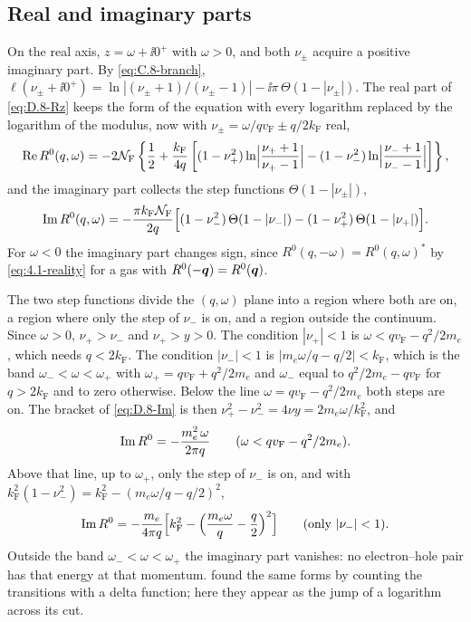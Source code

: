 \subsection*{Real and imaginary parts}

On the real axis, $z = \omega + \ii0^+$ with $\omega > 0$, and both $\nu_\pm$ acquire a positive imaginary part. By \cref{eq:C.8-branch}, $\ell(\nu_\pm + \ii0^+) = \ln|(\nu_\pm + 1)/(\nu_\pm - 1)| - \ii\pi\,\Theta(1 - |\nu_\pm|)$. The real part of \cref{eq:D.8-Rz} keeps the form of the equation with every logarithm replaced by the logarithm of the modulus, now with $\nu_\pm = \omega/qv_{\mathrm{F}} \pm q/2k_{\mathrm{F}}$ real,
\begin{equation}
  \operatorname{Re} R^0(q,\omega) = -2\mathcal{N}_{\mathrm{F}}\left\{\frac12 + \frac{k_{\mathrm{F}}}{4q}\left[(1 - \nu_+^2)\ln\Bigl|\frac{\nu_+ + 1}{\nu_+ - 1}\Bigr| - (1 - \nu_-^2)\ln\Bigl|\frac{\nu_- + 1}{\nu_- - 1}\Bigr|\right]\right\} ,
  \label{eq:D.8-Re}
\end{equation}
and the imaginary part collects the step functions $\Theta(1 - |\nu_\pm|)$,
\begin{equation}
  \operatorname{Im} R^0(q,\omega) = -\frac{\pi k_{\mathrm{F}}\mathcal{N}_{\mathrm{F}}}{2q}\Bigl[(1 - \nu_-^2)\,\Theta(1 - |\nu_-|) - (1 - \nu_+^2)\,\Theta(1 - |\nu_+|)\Bigr] .
  \label{eq:D.8-Im}
\end{equation}
For $\omega < 0$ the imaginary part changes sign, since $R^0(q,-\omega) = R^0(q,\omega)^*$ by \cref{eq:4.1-reality} for a gas with $R^0(-\bm{q}) = R^0(\bm{q})$.

The two step functions divide the $(q, \omega)$ plane into a region where both are on, a region where only the step of $\nu_-$ is on, and a region outside the continuum. Since $\omega > 0$, $\nu_+ > \nu_-$ and $\nu_+ > y > 0$. The condition $|\nu_+| < 1$ is $\omega < qv_{\mathrm{F}} - q^2/2m_e$, which needs $q < 2k_{\mathrm{F}}$. The condition $|\nu_-| < 1$ is $|m_e\omega/q - q/2| < k_{\mathrm{F}}$, which is the band $\omega_- < \omega < \omega_+$ with $\omega_+ = qv_{\mathrm{F}} + q^2/2m_e$ and $\omega_-$ equal to $q^2/2m_e - qv_{\mathrm{F}}$ for $q > 2k_{\mathrm{F}}$ and to zero otherwise. Below the line $\omega = qv_{\mathrm{F}} - q^2/2m_e$ both steps are on. The bracket of \cref{eq:D.8-Im} is then $\nu_+^2 - \nu_-^2 = 4\nu y = 2m_e\omega/k_{\mathrm{F}}^2$, and
\begin{equation*}
  \operatorname{Im} R^0 = -\frac{m_e^2\,\omega}{2\pi q} \qquad (\omega < qv_{\mathrm{F}} - q^2/2m_e) .
\end{equation*}
Above that line, up to $\omega_+$, only the step of $\nu_-$ is on, and with $k_{\mathrm{F}}^2(1 - \nu_-^2) = k_{\mathrm{F}}^2 - (m_e\omega/q - q/2)^2$,
\begin{equation*}
  \operatorname{Im} R^0 = -\frac{m_e}{4\pi q}\Bigl[k_{\mathrm{F}}^2 - \Bigl(\frac{m_e\omega}{q} - \frac{q}{2}\Bigr)^2\Bigr] \qquad (\text{only } |\nu_-| < 1) .
\end{equation*}
Outside the band $\omega_- < \omega < \omega_+$ the imaginary part vanishes: no electron--hole pair has that energy at that momentum.  found the same forms by counting the transitions with a delta function; here they appear as the jump of a logarithm across its cut.

